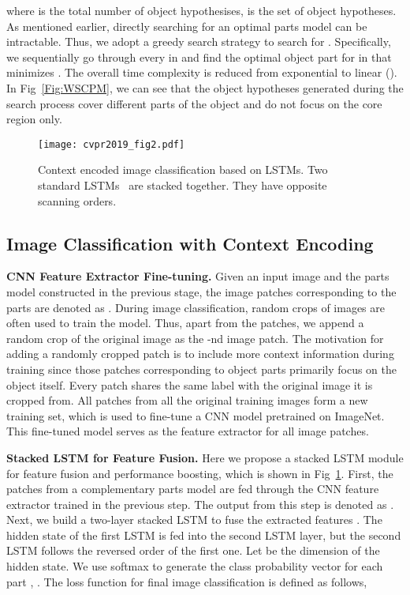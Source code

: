 \documentclass[10pt,twocolumn,letterpaper]{article}
\begin{document}
where  is the total number of object hypothesises,  
is the set of object hypotheses. As mentioned earlier, directly searching for an optimal parts model can be intractable. Thus, we adopt a greedy search strategy to search for . Specifically, we sequentially go through every  in  and find the optimal object part for  in  that minimizes . The overall time complexity is reduced from exponential to linear (). In Fig~\ref{Fig:WSCPM}, we can see that the object hypotheses generated during the search process cover different parts of the object and do not focus on the core region only.

\begin{figure}[ht]
  \centering
  \texttt{[image: cvpr2019\_fig2.pdf]}
  \caption{Context encoded image classification based on LSTMs. Two standard LSTMs~\cite{hochreiter1997long} are stacked together. They have opposite scanning orders.}
  \label{Fig:LSTM}
\end{figure}


\subsection{Image Classification with Context Encoding}
\noindent\textbf{CNN Feature Extractor Fine-tuning.} Given an input image  and the parts model  constructed in the previous stage, the image patches corresponding to the parts are denoted as . During image classification, random crops of images are often used to train the model. Thus, apart from the  patches, we append a random crop of the original image as the -nd image patch. The motivation for adding a randomly cropped patch is to include more context information during training since those patches corresponding to object parts primarily focus on the object itself. Every patch shares the same label with the original image it is cropped from. All patches from all the original training images form a new training set, which is used to fine-tune a CNN model pretrained on ImageNet. This fine-tuned model serves as the feature extractor for all image patches.

\noindent\textbf{Stacked LSTM for Feature Fusion.} Here we propose a stacked LSTM module  for feature fusion and performance boosting, which is shown in Fig~\ref{Fig:LSTM}. First, the  patches from a complementary parts model are fed through the CNN feature extractor  trained in the previous step. The output from this step is denoted as . Next, we build a two-layer stacked LSTM to fuse the extracted features . The hidden state of the first LSTM is fed into the second LSTM layer, but the second LSTM follows the reversed order of the first one. Let  be the dimension of the hidden state. We use softmax to generate the class probability vector for each part , . The loss function for final image classification is defined as follows,
    
\end{document}
